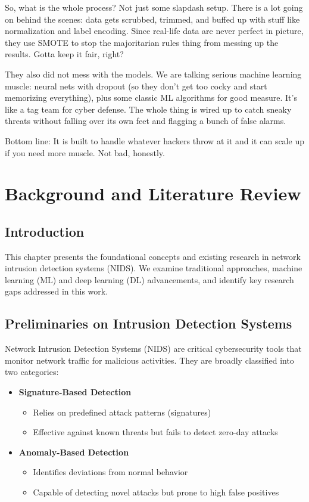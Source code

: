 \documentclass[conference]{IEEEtran}
\begin{document}
So, what is the whole process? Not just some slapdash setup. There is a lot going on behind the scenes: data gets scrubbed, trimmed, and buffed up with stuff like normalization and label encoding. Since real-life data are never perfect in picture, they use SMOTE to stop the majoritarian rules thing from messing up the results. Gotta keep it fair, right?

They also did not mess with the models. We are talking serious machine learning muscle: neural nets with dropout (so they don’t get too cocky and start memorizing everything), plus some classic ML algorithms for good measure. It’s like a tag team for cyber defense. The whole thing is wired up to catch sneaky threats without falling over its own feet and flagging a bunch of false alarms.

Bottom line: It is built to handle whatever hackers throw at it and it can scale up if you need more muscle. Not bad, honestly.
\section{Background and Literature Review}

\subsection{Introduction}
This chapter presents the foundational concepts and existing research in network intrusion detection systems (NIDS). We examine traditional approaches, machine learning (ML) and deep learning (DL) advancements, and identify key research gaps addressed in this work.

\subsection{Preliminaries on Intrusion Detection Systems}
Network Intrusion Detection Systems (NIDS) are critical cybersecurity tools that monitor network traffic for malicious activities. They are broadly classified into two categories:

\begin{itemize}
    \item \textbf{Signature-Based Detection}
    \begin{itemize}
        \item Relies on predefined attack patterns (signatures)
        \item Effective against known threats but fails to detect zero-day attacks \cite{sharafaldin2018toward}
    \end{itemize}
    
    \item \textbf{Anomaly-Based Detection}
    \begin{itemize}
        \item Identifies deviations from normal behavior
        \item Capable of detecting novel attacks but prone to high false positives \cite{sharafaldin2018toward}
    \end{itemize}
\end{itemize}
\end{document}

